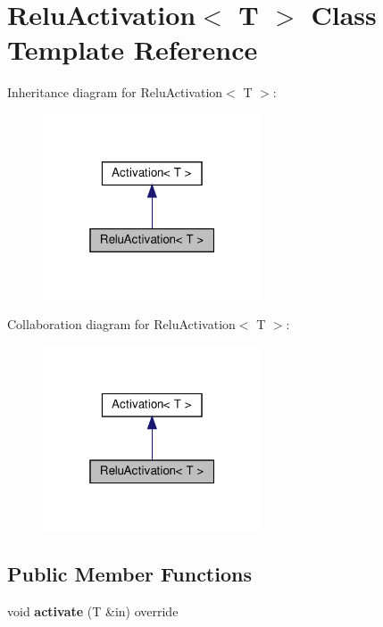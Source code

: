 \hypertarget{classReluActivation}{}\section{Relu\+Activation$<$ T $>$ Class Template Reference}
\label{classReluActivation}


Inheritance diagram for Relu\+Activation$<$ T $>$\+:
\nopagebreak
\begin{figure}[H]
\begin{center}
\leavevmode
\includegraphics[width=184pt]{classReluActivation__inherit__graph}
\end{center}
\end{figure}


Collaboration diagram for Relu\+Activation$<$ T $>$\+:
\nopagebreak
\begin{figure}[H]
\begin{center}
\leavevmode
\includegraphics[width=184pt]{classReluActivation__coll__graph}
\end{center}
\end{figure}
\subsection*{Public Member Functions}
\begin{DoxyCompactItemize}
\item 
\mbox{\label{classReluActivation_a7484ef1efed77fc30edd762809cdd7ea}} 
void {\bfseries activate} (T \&in) override
\end{DoxyCompactItemize}
